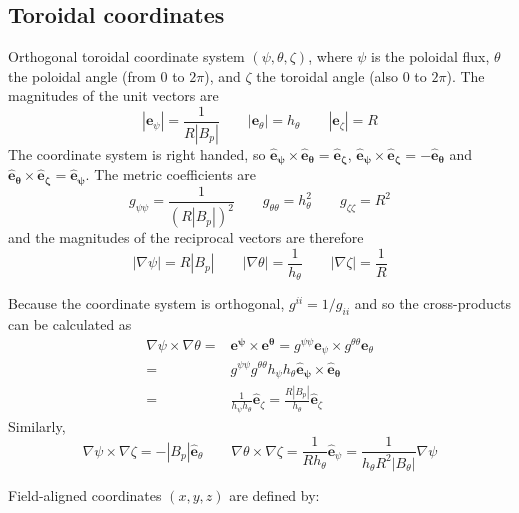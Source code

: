 \documentclass[12pt, a4paper]{article}
\newcommand{\Bp}{\ensuremath{B_\theta}}
\begin{document}
\subsection{Toroidal coordinates}

Orthogonal toroidal coordinate system $\left(\psi, \theta, \zeta\right)$, 
where $\psi$ is the poloidal flux, $\theta$ the poloidal angle
(from $0$ to $2\pi$), and $\zeta$ the toroidal angle (also $0$ to $2\pi$).
The magnitudes of the unit vectors are
\begin{equation}
\left|\mathbf{e}_\psi\right| = \frac{1}{R\left|B_p\right|} \qquad
\left|\mathbf{e}_\theta\right| = h_\theta \qquad
\left|\mathbf{e}_\zeta\right| = R
\label{eq:fluxmags}
\end{equation}
The coordinate system is right handed, so $\mathbf{\hat{e}_\psi\times\hat{e}_\theta = \hat{e}_\zeta}$,
$\mathbf{\hat{e}_\psi\times\hat{e}_\zeta = -\hat{e}_\theta}$ and $\mathbf{\hat{e}_\theta\times\hat{e}_\zeta = \hat{e}_\psi}$. The metric coefficients are
\begin{equation}
g_{\psi\psi} = \frac{1}{\left(R\left|B_p\right|\right)^2} \qquad
g_{\theta\theta} = h_\theta^2 \qquad
g_{\zeta\zeta} = R^2
\end{equation}
and the magnitudes of the reciprocal vectors are therefore
\begin{equation}
\left|\nabla\psi\right| = R\left|B_p\right| \qquad
\left|\nabla\theta\right| = \frac{1}{h_\theta} \qquad
\left|\nabla\zeta\right| = \frac{1}{R}
\label{eq:fluxmags2}
\end{equation}

Because the coordinate system is orthogonal, $g^{ii} = 1/g_{ii}$ and so the cross-products can be calculated as
\begin{eqnarray*}
\nabla\psi\times\nabla\theta = &\mathbf{e^\psi\times e^\theta} = 
g^{\psi\psi}\mathbf{e}_\psi\times g^{\theta\theta}\mathbf{e}_\theta \nonumber \\
= & g^{\psi\psi}g^{\theta\theta}h_\psi h_\theta\mathbf{\hat{e}_\psi\times\hat{e}_\theta} \nonumber \\
= &\frac{1}{h_\psi h_\theta}\mathbf{\hat{e}}_\zeta 
= \frac{R\left|B_p\right|}{h_\theta}\mathbf{\hat{e}}_\zeta
\end{eqnarray*}
Similarly, 
\[
\nabla\psi\times\nabla\zeta = -\left|B_p\right|\mathbf{\hat{e}}_\theta \qquad
\nabla\theta\times\nabla\zeta = \frac{1}{Rh_\theta}\mathbf{\hat{e}}_\psi = \frac{1}{h_\theta R^2\left|\Bp\right|}\nabla \psi
\]

Field-aligned coordinates $(x,y,z)$ are defined by:
\end{document}
